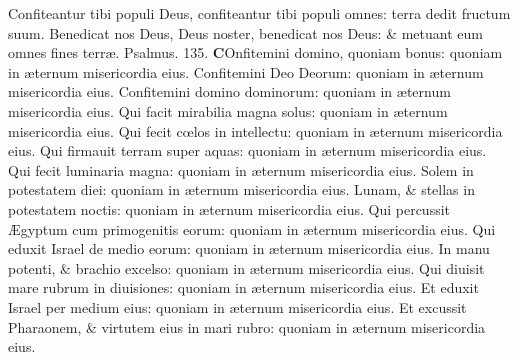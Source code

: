 \documentclass[a5paper,10pt]{book}
\def\ae{æ}
\def\AE{Æ}
\def\oe{œ}
\begin{document}
\begin{multicols*}{2}
\newline \color{red} C\color{black}onfiteantur tibi populi Deus, confiteantur tibi populi omnes: terra dedit fructum suum.
\newline \color{red} B\color{black}enedicat nos Deus, Deus noster, benedicat nos Deus: \& metuant eum omnes fines terr\ae . \quad \color{red} Psalmus. \hypertarget{ps135}{135.} \color{black}
\vspace{-.25em}
\lettrine[lines=2]{\bfseries \color{red} C}{}Onfitemini domino, quoniam bonus: quoniam in \ae ternum misericordia eius.
\newline \color{red} C\color{black}onfitemini Deo Deorum: quoniam in \ae ternum misericordia eius.
\newline \color{red} C\color{black}onfitemini domino dominorum: quoniam in \ae ternum misericordia eius.
\newline \color{red} Q\color{black}ui facit mirabilia magna solus: quoniam in \ae ternum misericordia eius.
\newline \color{red} Q\color{black}ui fecit c\oe los in intellectu: quoniam in \ae ternum misericordia eius.
\newline \color{red} Q\color{black}ui firmauit terram super aquas: quoniam in \ae ternum misericordia eius.
\newline \color{red} Q\color{black}ui fecit luminaria magna: quoniam in \ae ternum misericordia eius.
\newline \color{red} S\color{black}olem in potestatem diei: quoniam in \ae ternum misericordia eius.
\newline \color{red} L\color{black}unam, \& stellas in potestatem noctis: quoniam in \ae ternum misericordia eius.
\newline \color{red} Q\color{black}ui percussit \AE gyptum cum primogenitis eorum: quoniam in \ae ternum misericordia eius.
\newline \color{red} Q\color{black}ui eduxit Israel de medio eorum: quoniam in \ae ternum misericordia eius.
\newline \color{red} I\color{black}n manu potenti, \& brachio excelso: quoniam in \ae ternum misericordia eius.
\newline \color{red} Q\color{black}ui diuisit mare rubrum in diuisiones: quoniam in \ae ternum misericordia eius.
\newline \color{red} E\color{black}t eduxit Israel per medium eius: quoniam in \ae ternum misericordia eius.
\newline \color{red} E\color{black}t excussit Pharaonem, \& virtutem eius in mari rubro: quoniam in \ae ternum misericordia eius.

\end{multicols*}
\end{document}
